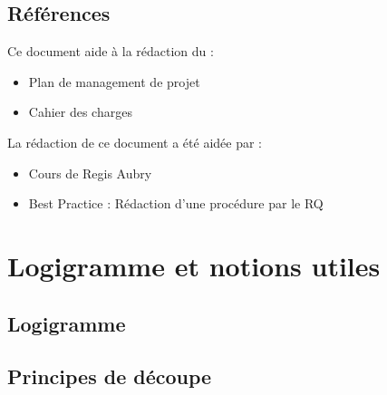 \subsection{Références}
Ce document aide à la rédaction du :
\begin{itemize}
\item Plan de management de projet
\item Cahier des charges
\end{itemize}
La rédaction de ce document a été aidée par :
\begin{itemize}
\item Cours de Regis Aubry
\item Best Practice : Rédaction d'une procédure par le RQ
\end{itemize}


\section{Logigramme et notions utiles}
\subsection{Logigramme}
\subsection{Principes de découpe}
